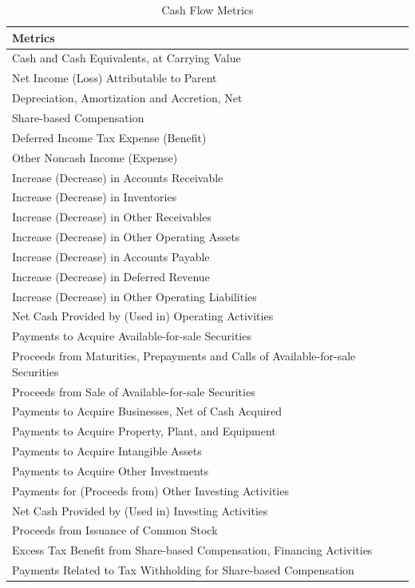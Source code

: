 \documentclass[]{book}
\theoremstyle{definition}
\theoremstyle{definition}
\theoremstyle{definition}
\theoremstyle{remark}
\begin{document}
\begin{table}[t]

\caption{\label{tab:unnamed-chunk-32}Cash Flow Metrics}
\centering
\begin{tabular}{l}
\toprule
Metrics\\
\midrule
Cash and Cash Equivalents, at Carrying Value\\
Net Income (Loss) Attributable to Parent\\
Depreciation, Amortization and Accretion, Net\\
Share-based Compensation\\
Deferred Income Tax Expense (Benefit)\\
\addlinespace
Other Noncash Income (Expense)\\
Increase (Decrease) in Accounts Receivable\\
Increase (Decrease) in Inventories\\
Increase (Decrease) in Other Receivables\\
Increase (Decrease) in Other Operating Assets\\
\addlinespace
Increase (Decrease) in Accounts Payable\\
Increase (Decrease) in Deferred Revenue\\
Increase (Decrease) in Other Operating Liabilities\\
Net Cash Provided by (Used in) Operating Activities\\
Payments to Acquire Available-for-sale Securities\\
\addlinespace
Proceeds from Maturities, Prepayments and Calls of Available-for-sale Securities\\
Proceeds from Sale of Available-for-sale Securities\\
Payments to Acquire Businesses, Net of Cash Acquired\\
Payments to Acquire Property, Plant, and Equipment\\
Payments to Acquire Intangible Assets\\
\addlinespace
Payments to Acquire Other Investments\\
Payments for (Proceeds from) Other Investing Activities\\
Net Cash Provided by (Used in) Investing Activities\\
Proceeds from Issuance of Common Stock\\
Excess Tax Benefit from Share-based Compensation, Financing Activities\\
\addlinespace
Payments Related to Tax Withholding for Share-based Compensation\\

\end{tabular}
\end{table}
\end{document}
